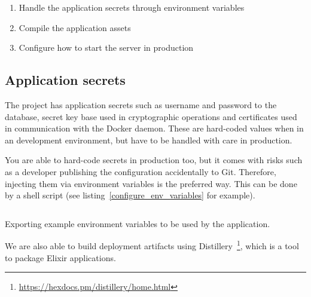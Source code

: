 \begin{enumerate}
    \item Handle the application secrets through environment variables
    \item Compile the application assets
    \item Configure how to start the server in production
\end{enumerate}

\subsection{Application secrets}

The project has application secrets such as username and password to the database, secret key base used in cryptographic operations and certificates used in communication with the Docker daemon. These are hard-coded values when in an development environment, but have to be handled with care in production.

You are able to hard-code secrets in production too, but it comes with risks such as a developer publishing the configuration accidentally to Git. Therefore, injecting them via environment variables is the preferred way. This can be done by a shell script (see listing~\ref{configure_env_variables} for example).

\begin{listing}
    \inputminted{bash}{code/env.sh}
    \caption{Exporting example environment variables to be used by the application.}
    \label{configure_env_variables}
\end{listing}

We are also able to build deployment artifacts using Distillery~\footnote{\url{https://hexdocs.pm/distillery/home.html}}, which is a tool to package Elixir applications.

